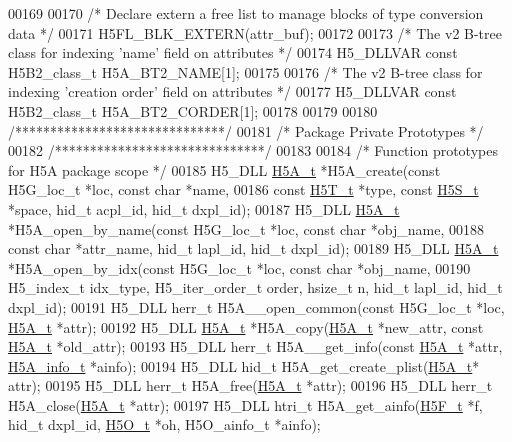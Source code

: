 \begin{DoxyCode}
00169 
00170 \textcolor{comment}{/* Declare extern a free list to manage blocks of type conversion data */}
00171 H5FL\_BLK\_EXTERN(attr\_buf);
00172 
00173 \textcolor{comment}{/* The v2 B-tree class for indexing 'name' field on attributes */}
00174 H5\_DLLVAR \textcolor{keyword}{const} H5B2\_class\_t H5A\_BT2\_NAME[1];
00175 
00176 \textcolor{comment}{/* The v2 B-tree class for indexing 'creation order' field on attributes */}
00177 H5\_DLLVAR \textcolor{keyword}{const} H5B2\_class\_t H5A\_BT2\_CORDER[1];
00178 
00179 
00180 \textcolor{comment}{/******************************/}
00181 \textcolor{comment}{/* Package Private Prototypes */}
00182 \textcolor{comment}{/******************************/}
00183 
00184 \textcolor{comment}{/* Function prototypes for H5A package scope */}
00185 H5\_DLL \hyperlink{struct_h5_a__t}{H5A\_t} *H5A\_create(\textcolor{keyword}{const} H5G\_loc\_t *loc, \textcolor{keyword}{const} \textcolor{keywordtype}{char} *name,
00186     \textcolor{keyword}{const} \hyperlink{struct_h5_t__t}{H5T\_t} *type, \textcolor{keyword}{const} \hyperlink{struct_h5_s__t}{H5S\_t} *space, hid\_t acpl\_id, hid\_t dxpl\_id);
00187 H5\_DLL \hyperlink{struct_h5_a__t}{H5A\_t} *H5A\_open\_by\_name(\textcolor{keyword}{const} H5G\_loc\_t *loc, \textcolor{keyword}{const} \textcolor{keywordtype}{char} *obj\_name,
00188     \textcolor{keyword}{const} \textcolor{keywordtype}{char} *attr\_name, hid\_t lapl\_id, hid\_t dxpl\_id);
00189 H5\_DLL \hyperlink{struct_h5_a__t}{H5A\_t} *H5A\_open\_by\_idx(\textcolor{keyword}{const} H5G\_loc\_t *loc, \textcolor{keyword}{const} \textcolor{keywordtype}{char} *obj\_name,
00190     H5\_index\_t idx\_type, H5\_iter\_order\_t order, hsize\_t n, hid\_t lapl\_id, hid\_t dxpl\_id);
00191 H5\_DLL herr\_t H5A\_\_open\_common(\textcolor{keyword}{const} H5G\_loc\_t *loc, \hyperlink{struct_h5_a__t}{H5A\_t} *attr);
00192 H5\_DLL \hyperlink{struct_h5_a__t}{H5A\_t} *H5A\_copy(\hyperlink{struct_h5_a__t}{H5A\_t} *new\_attr, \textcolor{keyword}{const} \hyperlink{struct_h5_a__t}{H5A\_t} *old\_attr);
00193 H5\_DLL herr\_t H5A\_\_get\_info(\textcolor{keyword}{const} \hyperlink{struct_h5_a__t}{H5A\_t} *attr, \hyperlink{struct_h5_a__info__t}{H5A\_info\_t} *ainfo);
00194 H5\_DLL hid\_t H5A\_get\_create\_plist(\hyperlink{struct_h5_a__t}{H5A\_t}* attr);
00195 H5\_DLL herr\_t H5A\_free(\hyperlink{struct_h5_a__t}{H5A\_t} *attr);
00196 H5\_DLL herr\_t H5A\_close(\hyperlink{struct_h5_a__t}{H5A\_t} *attr);
00197 H5\_DLL htri\_t H5A\_get\_ainfo(\hyperlink{struct_h5_f__t}{H5F\_t} *f, hid\_t dxpl\_id, \hyperlink{struct_h5_o__t}{H5O\_t} *oh, H5O\_ainfo\_t *ainfo);

\end{DoxyCode}
